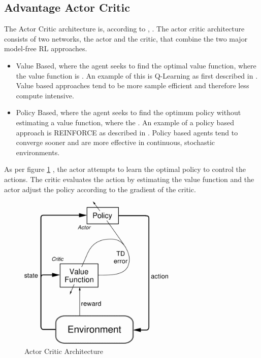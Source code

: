 \documentclass[oneside,12pt]{Classes/RoboticsLaTeX}
\begin{document}
\subsection{Advantage Actor Critic}
The Actor Critic architecture is, according to \citep[p.338]{SuttonRichardS.2018Rl:a}, .
The actor critic architecture consists of two networks, the actor and the critic, that combine the two major model-free RL approaches.
\begin{itemize}
    \item Value Based, where  the agent seeks to find the optimal value function, where the value function is  \citep[p.58]{SuttonRichardS.2018Rl:a}. An example of this is Q-Learning as first described in \citet{ChrisWatkins89}. Value based approaches tend to be more sample efficient and therefore less compute intensive.
    \item Policy Based, where the agent seeks to find the optimum policy without estimating a value function, where the . An example of a policy based approach is REINFORCE as described in \citet{WilliamsRonaldJ1992Ssga}. Policy based agents tend to converge sooner and are more effective in continuous, stochastic environments.
\end{itemize}

As per figure \ref{fig:acarch} \citep[p.151]{SuttonRichardS1998Rl:a}, the actor attempts to learn the optimal policy to control the actions.  The critic evaluates the action by estimating the value function and the actor adjust the policy according to the gradient of the critic.

\begin{figure}[h]
    \centering
    \includegraphics[width=75mm]{Figures/AC.png}
    \caption{Actor Critic Architecture}
    \label{fig:acarch}
\end{figure}
\end{document}

